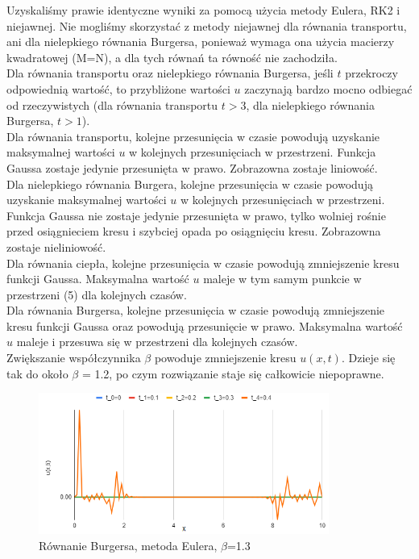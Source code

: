 \documentclass[a4paper,12pt]{article}
\begin{document}
	Uzyskaliśmy prawie identyczne wyniki za pomocą użycia metody Eulera, RK2 i niejawnej. Nie mogliśmy skorzystać z metody niejawnej dla równania transportu, ani dla nielepkiego równania Burgersa, ponieważ wymaga ona użycia macierzy kwadratowej (M=N), a dla tych równań ta równość nie zachodziła.\\
	
	Dla równania transportu oraz nielepkiego równania Burgersa, jeśli $t$ przekroczy odpowiednią wartość, to przybliżone wartości $u$ zaczynają bardzo mocno odbiegać od rzeczywistych (dla równania transportu $t>3$, dla nielepkiego równania Burgersa, $t>1$).\\
	
	Dla równania transportu, kolejne przesunięcia w czasie powodują uzyskanie maksymalnej wartości $u$ w kolejnych przesunięciach w przestrzeni.  Funkcja Gaussa zostaje jedynie przesunięta w prawo.  Zobrazowna zostaje liniowość.\\
	
	Dla nielepkiego równania Burgera, kolejne przesunięcia w czasie powodują uzyskanie maksymalnej wartości $u$ w kolejnych przesunięciach w przestrzeni. Funkcja Gaussa nie zostaje jedynie przesunięta w prawo, tylko wolniej rośnie przed osiągnieciem kresu i szybciej opada po osiągnięciu kresu. Zobrazowna zostaje nieliniowość.\\
	
	Dla równania ciepła, kolejne przesunięcia w czasie powodują zmniejszenie kresu funkcji Gaussa. Maksymalna wartość $u$ maleje w tym samym punkcie w przestrzeni (5) dla kolejnych czasów.\\ 
	
	Dla równania Burgersa, kolejne przesunięcia w czasie powodują zmniejszenie kresu funkcji Gaussa oraz powodują przesunięcie w prawo. Maksymalna wartość $u$ maleje i przesuwa się w przestrzeni dla kolejnych czasów.\\
	
	Zwiększanie współczynnika $\beta$ powoduje zmniejszenie kresu $u(x,t)$. Dzieje się tak do około $\beta$ = 1.2, po czym rozwiązanie staje się całkowicie niepoprawne.\\
	\begin{figure}[h]
		\caption{Równanie Burgersa, metoda Eulera, $\beta$=1.3}
		\centering
		\includegraphics[width=0.85\textwidth]{rys/10.png}
	\end{figure}
	
\end{document}
